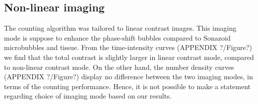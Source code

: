 \subsection{Non-linear imaging}
The counting algorithm was tailored to linear contrast images. This imaging mode is suppose to enhance the phase-shift bubbles compared to Sonazoid\texttrademark{} microbubbles and tissue. From the time-intensity curves (APPENDIX ?/Figure?) we find that the total contrast is slightly larger in linear contrast mode, compared to non-linear contrast mode. On the other hand, the number density curves (APPENDIX ?/Figure?) display no difference between the two imaging modes, in terms of the counting performance. Hence, it is not possible to make a statement regarding choice of imaging mode based on our results.





%
%

